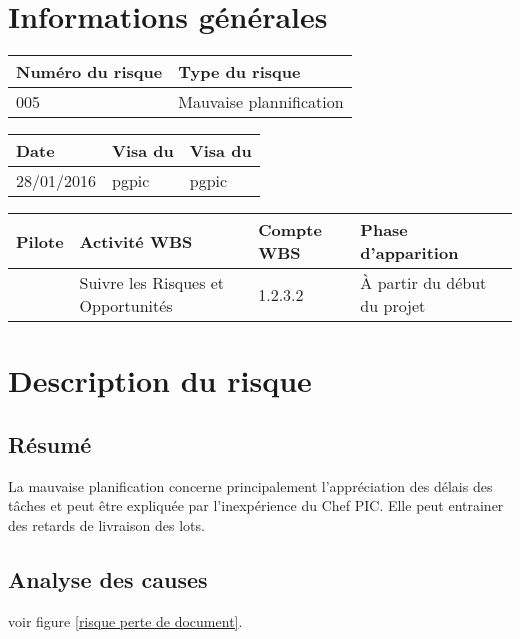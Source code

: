 
\section*{Informations générales}
 
\begin{table}[H]
\centering
	\begin{tabularx}{16.8cm}{|X|X|}
	\hline
	\rowcolor{gray!40} Numéro du risque & Type du risque \\
	\hline
	005 & Mauvaise plannification \\
	\hline
	\end{tabularx}
\end{table}

\begin{table}[H]
\centering
	\begin{tabularx}{16.8cm}{|X|X|X|}
	\hline
	\rowcolor{gray!40} Date & Visa du \RQ & Visa du \CP \\
	\hline
	 28/01/2016 & pgpic & pgpic \\
	\hline
	\end{tabularx}
\end{table}

\begin{table}[H]
\centering
	\begin{tabularx}{16.8cm}{|X|X|X|X|}
	\hline
	\rowcolor{gray!40} Pilote & Activité WBS & Compte WBS & Phase d'apparition \\
	\hline
	 \Florian & Suivre les Risques et Opportunités & 1.2.3.2 & À partir du début du projet\\
	\hline
	\end{tabularx}
\end{table}

\section*{Description du risque}

\subsection*{Résumé}
	La mauvaise planification concerne principalement l’appréciation des délais des tâches et peut être expliquée par l’inexpérience du Chef PIC. Elle peut entrainer des retards de livraison des lots.

\subsection*{Analyse des causes}
	voir figure \ref{risque perte de document}.

